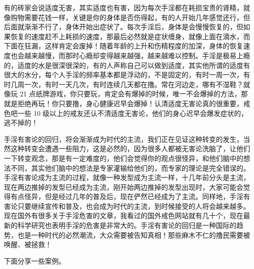 有的砖家会说适度无害，其实适度也有害，因为每次手淫都在耗损宝贵的肾精，就像购物需要花钱一样，关键是你的身体是否伤得起，有的人开始几年感觉还行，但后面就渐渐不行了，身体开始出症状了。每次手淫后，身体是会慢慢恢复的，但如果恢复的速度赶不上耗损的速度，那最后必然就是症状缠身，就像上面在滴水，而下面在狂漏，这样肯定会废掉！随着年龄的上升和伤精程度的加深，身体的恢复速度也会越来越慢，而那时心瘾却变得越来越强，越来越难以控制。手淫是极易上瘾的，适度的水是很深很深的，有的人声称自己可以做到适度，其实他所谓的适度有很大的水分，每个人手淫的频率基本都是浮动的，不是固定的，有时一周一次，有时几周一次，有时一天几次，有时连续几天都在撸。常在河边走，哪有不湿鞋？就像玩 21 点纸牌游戏，你只要玩，肯定会有爆掉的时候，唯一不会爆掉的方法，那就是拒绝再玩！你只要撸，身心健康迟早会爆掉！认清适度无害论真的很重要，戒色吧一些 10 级以上的戒友还认不清适度无害论，他们的身心迟早会爆发症状的，逃不掉的！

手淫有害论的回归，将会渐渐成为时代的主流，我们正在见证这种转变的发生，当然这种转变会遭遇一些阻力，这是必然的，因为很多人都被无害论洗脑了，让他们一下转变观念，那是有一定难度的，他们会觉得你的观点很怪异，和他们脑中的想法不同，其实他们脑中的想法是专家灌输给他们的，而专家的理论是完全错误的。手淫有害论成为主流的过程，就像一种发型成为主流一样，十几年前分头是主流，现在两边推掉的发型已经成为主流，刚开始两边推掉的发型出现时，大家可能会觉得有点怪异，但是经过几年的普及后，现在俨然已经成为了主流。同样地，手淫有害论只要继续宣传和普及，也会成为时代的主流，到时候接受的人将会越来越多。现在国外有很多关于手淫危害的文章，我看过的国外戒色网站就有几十个，现在最新的科学研究也表明手淫的危害是非常大的。手淫有害论的回归是一种国际的趋势，也是一种时代的必然潮流，大众需要被告知真相！那些麻木不仁的撸民需要被唤醒、被拯救！

下面分享一些案例。

